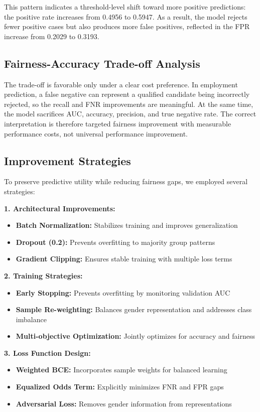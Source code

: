 \documentclass[11pt,a4paper]{article}
\begin{document}
This pattern indicates a threshold-level shift toward more positive predictions: the positive rate increases from 0.4956 to 0.5947. As a result, the model rejects fewer positive cases but also produces more false positives, reflected in the FPR increase from 0.2029 to 0.3193.

\subsection{Fairness-Accuracy Trade-off Analysis}

The trade-off is favorable only under a clear cost preference. In employment prediction, a false negative can represent a qualified candidate being incorrectly rejected, so the recall and FNR improvements are meaningful. At the same time, the model sacrifices AUC, accuracy, precision, and true negative rate. The correct interpretation is therefore targeted fairness improvement with measurable performance costs, not universal performance improvement.

\subsection{Improvement Strategies}

To preserve predictive utility while reducing fairness gaps, we employed several strategies:

\textbf{1. Architectural Improvements:}
\begin{itemize}
    \item \textbf{Batch Normalization:} Stabilizes training and improves generalization
    \item \textbf{Dropout (0.2):} Prevents overfitting to majority group patterns
    \item \textbf{Gradient Clipping:} Ensures stable training with multiple loss terms
\end{itemize}

\textbf{2. Training Strategies:}
\begin{itemize}
    \item \textbf{Early Stopping:} Prevents overfitting by monitoring validation AUC
    \item \textbf{Sample Re-weighting:} Balances gender representation and addresses class imbalance
    \item \textbf{Multi-objective Optimization:} Jointly optimizes for accuracy and fairness
\end{itemize}

\textbf{3. Loss Function Design:}
\begin{itemize}
    \item \textbf{Weighted BCE:} Incorporates sample weights for balanced learning
    \item \textbf{Equalized Odds Term:} Explicitly minimizes FNR and FPR gaps
    \item \textbf{Adversarial Loss:} Removes gender information from representations
\end{itemize}
\end{document}
